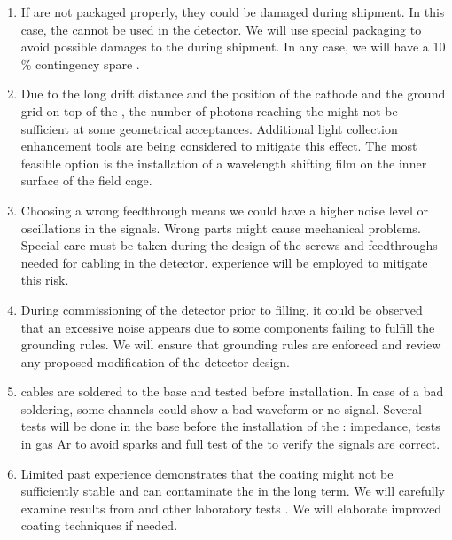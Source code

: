 \begin{enumerate}
\item If  are not packaged properly, they could be damaged during shipment. In this case, the  cannot be used in the detector. We will use special packaging to avoid possible damages to the  during shipment. In any case, we will have a \num{10} \% contingency spare .

\item Due to the long drift distance and the position of the cathode and the ground grid on top of the , the number of photons reaching the  might not be sufficient at some geometrical acceptances. Additional light collection enhancement tools are being considered to mitigate this effect. The most feasible option is the installation of a wavelength shifting film on the inner surface of the field cage.

\item Choosing a wrong feedthrough means we could have a higher noise level or oscillations in the signals. Wrong parts might cause mechanical problems. Special care must be taken during the design of the screws and  feedthroughs needed for cabling in the detector.  experience will be employed to mitigate this risk.

\item During commissioning of the detector prior to  filling, it could be observed that an excessive noise appears due to some components failing to fulfill the grounding rules. We will ensure that grounding rules are enforced and review any proposed modification of the detector design.

\item {} cables are soldered to the  base and tested before installation. In case of a bad soldering, some channels could show a bad waveform or no signal. Several tests will be done in the base before the installation of the : impedance,  tests in gas Ar to avoid sparks and full test of the  to verify the signals are correct.

\item Limited past experience demonstrates that the  coating might not be sufficiently stable and can contaminate the  in the long term. We will carefully examine results from  and other laboratory tests%
. We will elaborate improved coating techniques if needed.

\end{enumerate}